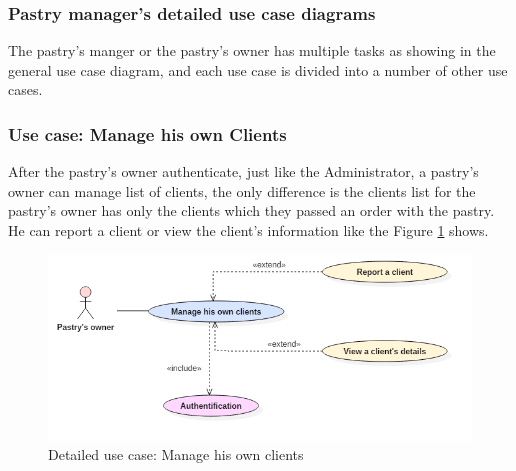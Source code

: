 \documentclass[12pt,a4paper]{report}
\begin{document}
		\subsubsection{Pastry manager's detailed use case diagrams }
		The pastry's manger or the pastry's owner has multiple tasks as showing in the general use case diagram, and each use case is divided into a number of other use cases.
		
		\subsubsection*{Use case: Manage his own Clients}
		After the pastry's owner authenticate, just like the Administrator, a pastry's owner can manage list of clients, the only difference is the clients list for the pastry's owner has only the clients which they passed an order with the pastry. He can report a client or view the client's information like the Figure \ref{user-case-manage-clients-pastry} shows.
		\begin{figure}[H]
			\centering
			\includegraphics[width=5in,keepaspectratio]{gererClientspastry.png}
			\caption{Detailed use case: Manage his own clients}
			\label{user-case-manage-clients-pastry}
		\end{figure}
\end{document}
